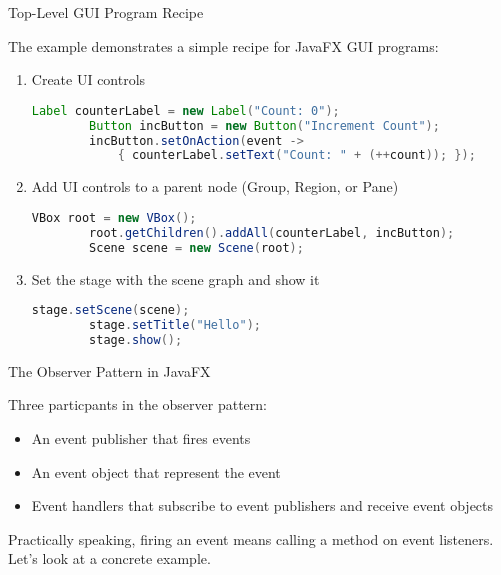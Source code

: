 \documentclass{beamer}
\begin{document}
\begin{frame}[fragile]{Top-Level GUI Program Recipe}

The  example demonstrates a simple recipe for JavaFX GUI programs:
\begin{enumerate}
\item Create UI controls
\begin{lstlisting}[language=Java]
        Label counterLabel = new Label("Count: 0");
        Button incButton = new Button("Increment Count");
        incButton.setOnAction(event ->
            { counterLabel.setText("Count: " + (++count)); });
\end{lstlisting}
\item Add UI controls to a parent node (Group, Region, or Pane)
\begin{lstlisting}[language=Java]
        VBox root = new VBox();
        root.getChildren().addAll(counterLabel, incButton);
        Scene scene = new Scene(root);
\end{lstlisting}
\item Set the stage with the scene graph and show it
\begin{lstlisting}[language=Java]
        stage.setScene(scene);
        stage.setTitle("Hello");
        stage.show();
\end{lstlisting}
\end{enumerate}

\end{frame}


\begin{frame}[fragile]{The Observer Pattern in JavaFX}


Three particpants in the observer pattern:
\begin{itemize}
\item An event publisher that fires events
\item An event object that represent the event
\item Event handlers that subscribe to event publishers and receive event objects
\end{itemize}

Practically speaking, firing an event means calling a method on event listeners.  Let's look at a concrete example.




\end{frame}
\end{document}
